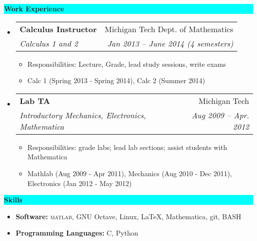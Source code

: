 \documentclass[letterpaper,10pt]{article}
\makeatletter
\newcommand{\resitem}[1]{\item #1 \vspace{-2pt}}
\newcommand{\resheading}[1]{{\large \colorbox{Cyan}{\begin{minipage}{\textwidth}{\textbf{#1 \vphantom{p\^{E}}}}\end{minipage}}}}
\newcommand{\ressubheading}[4]{
\begin{tabular*}{6.5in}{l@{\extracolsep{\fill}}r}
		\textbf{#1} & #2 \\
		\textit{#3} & \textit{#4} \\
\end{tabular*}\vspace{-6pt}}
\makeatother
\begin{document}
\resheading{Work Experience}
\begin{itemize}
\item%
	\ressubheading{Calculus Instructor}{Michigan Tech Dept. of Mathematics}{Calculus 1 and 2}{Jan 2013 -- June 2014 (4 semesters)}
	{\footnotesize
	\begin{itemize}
		\resitem{Responsibilities: Lecture, Grade, lead study sessions, write exams}
    \resitem{Calc 1 (Spring 2013 - Spring 2014), Calc 2 (Summer 2014)}
	\end{itemize}
	}
\item%
	\ressubheading{Lab TA}{Michigan Tech}{Introductory Mechanics, Electronics, Mathematica}{Aug 2009 -- Apr. 2012}
	{\footnotesize
	\begin{itemize}
		\resitem{Responsibilities: grade labs; lead lab sections; assist students with Mathematica}
		\resitem{Mathlab (Aug 2009 - Apr 2011), Mechanics (Aug 2010 - Dec 2011), Electronics (Jan 2012 - May 2012)}
	\end{itemize}
	}
\begin{comment}	
\item%
	\ressubheading{MathLab Lab Consultant}{Michigan Tech Dept. of Mathematical Sciences}{Calculus 1,2, and 3}{Jan. 2009 -- Apr. 2011}
	{\footnotesize
	\begin{itemize}
		\resitem{8 to 15 hours per week}
	\end{itemize}
	}
\end{comment}
\end{itemize}

\resheading{Skills}
\begin{itemize}
	\resitem{\textbf{Software:} \textsc{matlab}, GNU Octave, Linux, \LaTeX, Mathematica, git, BASH}
	\resitem{\textbf{Programming Languages:} C, Python}
\end{itemize}
\end{document}
